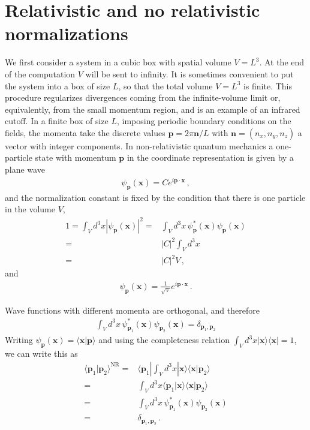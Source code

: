 \section{Relativistic and no relativistic normalizations}
\label{sec:relat-no-relat}
We first consider a system in a cubic box with spatial volume
$V=L^3$. At the end of the computation $V$ will be sent to infinity.
It is sometimes convenient to put the system into a box of size $L$,
so that the total volume $V = L^3$ is finite. This procedure
regularizes divergences coming from the infinite-volume limit or,
equivalently, from the small momentum region, and is an example of an
infrared cutoff. In a finite box of size $L$, imposing periodic
boundary conditions on the fields, the momenta take the discrete
values $\mathbf{p}=2\pi\mathbf{n}/L$ with $\mathbf{n}=(n_x,n_y,n_z)$ a
vector with integer components. In non-relativistic quantum mechanics
a one-particle state with momentum $\mathbf{p}$ in the coordinate
representation is given by a plane wave
\begin{align}
  \psi_\mathbf{p}(\mathbf{x})=C e^{i\mathbf{p}\cdot\mathbf{x}}\,,
\end{align}
and the normalization constant is fixed by the condition that there is
one particle in the volume $V$,
\begin{align}
1=\int_V d^3x\left|\psi_\mathbf{p}(\mathbf{x})\right|^2=&\int_V d^3x\,\psi_\mathbf{p}^*(\mathbf{x})
\psi_\mathbf{p}(\mathbf{x})\nonumber\\
=&|C|^2\int_Vd^3x\nonumber\\
=&|C|^2V\,,
\end{align}
and 
\begin{align}
  \psi_\mathbf{p}(\mathbf{x})=\frac{1}{\sqrt{V}} e^{i\mathbf{p}\cdot\mathbf{x}}\,.
\end{align}

Wave functions with different momenta are orthogonal, and therefore
\begin{align}
  \int_V d^3x\,\psi_{\mathbf{p}_1}^*(\mathbf{x})\psi_{\mathbf{p}_2}(\mathbf{x})
  =\delta_{\mathbf{p}_1,\mathbf{p}_2}
\end{align}
Writing $\psi_{\mathbf{p}}(\mathbf{x})=\langle\mathbf{x}|\mathbf{p}\rangle$ and using the completeness relation $\int_Vd^3x|\mathbf{x}\rangle\langle\mathbf{x}|=1$, we can write this as
\begin{align}
\label{eq:42}
  \langle\mathbf{p}_1|\mathbf{p}_2\rangle^{\text{NR}}=&
\langle\mathbf{p}_1|\int_Vd^3x|\mathbf{x}\rangle\langle\mathbf{x}|\mathbf{p}_2\rangle\nonumber\\
=&\int_Vd^3x\langle\mathbf{p}_1|\mathbf{x}\rangle\langle\mathbf{x}|\mathbf{p}_2\rangle\nonumber\\
=&\int_V d^3x\,\psi_{\mathbf{p}_1}^*(\mathbf{x})\psi_{\mathbf{p}_2}(\mathbf{x})\nonumber\\
  =&\delta_{\mathbf{p}_1,\mathbf{p}_2}\,.
\end{align}

